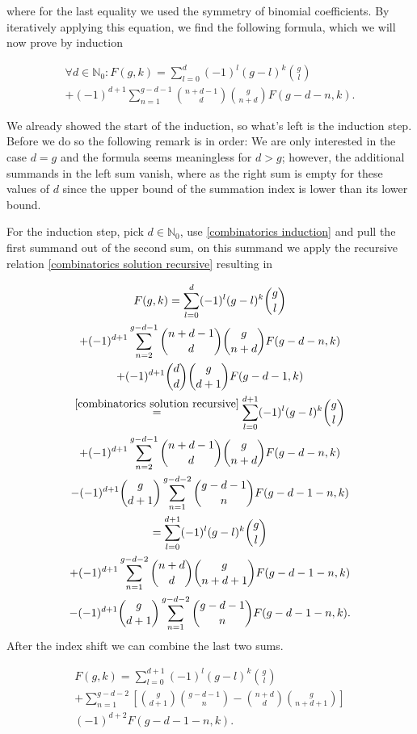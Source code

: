 \documentclass[b5paper,draft,openbib,12pt]{memoir}
\begin{document}
where for the last equality we used the symmetry of binomial coefficients.
By iteratively applying this equation, we find the following formula, which we will now prove by induction

\begin{multline}\label{combinatorics induction}
\forall d\in\mathbb{N}_0: F(g,k)=\sum_{l=0}^d (-1)^l (g-l)^k \binom{g}{l}\\
+(-1)^{d+1} \sum_{n=1}^{g-d-1} \binom{n+d-1}{d} \binom{g}{n+d} F(g-d-n,k).
\end{multline}

We already showed the start of the induction, so what's left is the induction step. Before we do so the
following remark is in order: We are only interested in the case \(d=g\) and the formula seems meaningless
for \(d>g\); however, the additional summands in the left sum vanish, where as the right sum is empty
for these values of \(d\) since the  upper bound of the summation index is lower than its lower bound.

For the induction step, pick \(d\in\mathbb{N}_0\), use \eqref{combinatorics induction} and pull the first summand
 out of the second sum,
on this summand we apply the recursive relation \eqref{combinatorics solution recursive} resulting in

\begin{multline}
F(g,k)=\sum_{l=0}^d (-1)^l (g-l)^k \binom{g}{l}\\
 + (-1)^{d+1}\sum_{n=2}^{g-d-1} \binom{n+d-1}{d}\binom{g}{n+d} F(g-d-n,k)\\
  + (-1)^{d+1} \binom{d}{d} \binom{g}{d+1} F(g-d-1,k)\\
\overset{\eqref{combinatorics solution recursive}}{=}\sum_{l=0}^{d+1} (-1)^l (g-l)^k \binom{g}{l}\\
+(-1)^{d+1} \sum_{n=2}^{g-d-1} \binom{n+d-1}{d} \binom{g}{n+d} F(g-d-n,k)\\
-(-1)^{d+1} \binom{g}{d+1} \sum_{n=1}^{g-d-2} \binom{g-d-1}{n} F(g-d-1-n,k)\\
=\sum_{l=0}^{d+1} (-1)^l (g-l)^k \binom{g}{l}\\
+(-1)^{d+1} \sum_{n=1}^{g-d-2} \binom{n+d}{d} \binom{g}{n+d+1} F(g-d-1-n,k)\\
-(-1)^{d+1} \binom{g}{d+1} \sum_{n=1}^{g-d-2} \binom{g-d-1}{n} F(g-d-1-n,k).
\end{multline}
After the index shift we can combine the last two sums. 

\begin{multline}
F(g,k)= \sum_{l=0}^{d+1} (-1)^l (g-l)^k \binom{g}{l}\\
+ \sum_{n=1}^{g-d-2}\left[\binom{g}{d+1} \binom{g-d-1}{n} - \binom{n+d}{d} \binom{g}{n+d+1} \right] 
\\(-1)^{d+2} F(g-d-1-n,k).
\end{multline}
\end{document}
